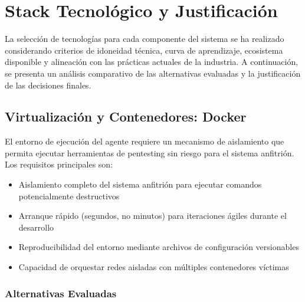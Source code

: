 
\section{Stack Tecnológico y Justificación}
\label{sec:stack_tecnologico}

La selección de tecnologías para cada componente del sistema se ha realizado considerando criterios de idoneidad técnica, curva de aprendizaje, ecosistema disponible y alineación con las prácticas actuales de la industria. A continuación, se presenta un análisis comparativo de las alternativas evaluadas y la justificación de las decisiones finales.

\subsection{Virtualización y Contenedores: Docker}

El entorno de ejecución del agente requiere un mecanismo de aislamiento que permita ejecutar herramientas de pentesting sin riesgo para el sistema anfitrión. Los requisitos principales son:

\begin{itemize}
    \item Aislamiento completo del sistema anfitrión para ejecutar comandos potencialmente destructivos
    \item Arranque rápido (segundos, no minutos) para iteraciones ágiles durante el desarrollo
    \item Reproducibilidad del entorno mediante archivos de configuración versionables
    \item Capacidad de orquestar redes aisladas con múltiples contenedores víctimas
\end{itemize}

\subsubsection{Alternativas Evaluadas}

